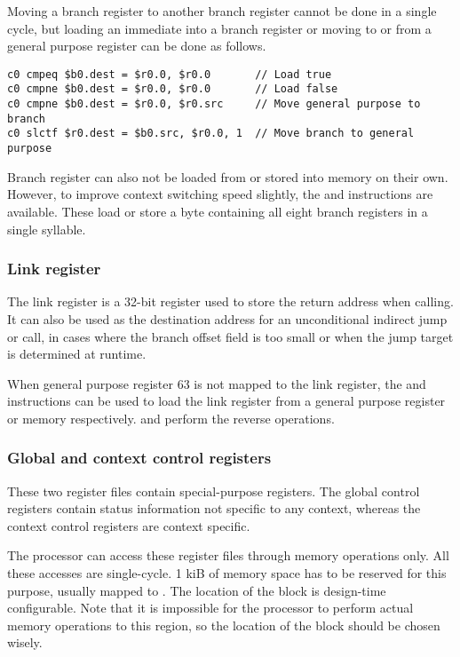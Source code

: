 Moving a branch register to another branch register cannot be done in a single
cycle, but loading an immediate into a branch register or moving to or from a
general purpose register can be done as follows.

\begin{lstlisting}[numbers=none, basicstyle=\footnotesize, language=vexasm]
c0 cmpeq $b0.dest = $r0.0, $r0.0       // Load true
c0 cmpne $b0.dest = $r0.0, $r0.0       // Load false
c0 cmpne $b0.dest = $r0.0, $r0.src     // Move general purpose to branch
c0 slctf $r0.dest = $b0.src, $r0.0, 1  // Move branch to general purpose
\end{lstlisting}

Branch register can also not be loaded from or stored into memory on their own.
However, to improve context switching speed slightly, the  and
 instructions are available. These load or store a byte containing
all eight branch registers in a single syllable.

\subsubsection{Link register}
\label{sec:core-ug-isa-regs-lr}

The link register is a 32-bit register used to store the return address when
calling. It can also be used as the destination address for an unconditional
indirect jump or call, in cases where the branch offset field is too small or
when the jump target is determined at runtime.

When general purpose register 63 is not mapped to the link register, the 
 and  instructions can be used to load the link register 
from a general purpose register or memory respectively.  and 
 perform the reverse operations.

\subsubsection{Global and context control registers}
\label{sec:core-ug-isa-regs-creg}

These two register files contain special-purpose registers. The global control
registers contain status information not specific to any context, whereas the
context control registers are context specific.

The processor can access these register files through memory operations only. 
All these accesses are single-cycle. 1 kiB of memory space has to be reserved 
for this purpose, usually mapped to . The 
location of the block is design-time configurable. Note that it is impossible 
for the processor to perform actual memory operations to this region, so the 
location of the block should be chosen wisely.

